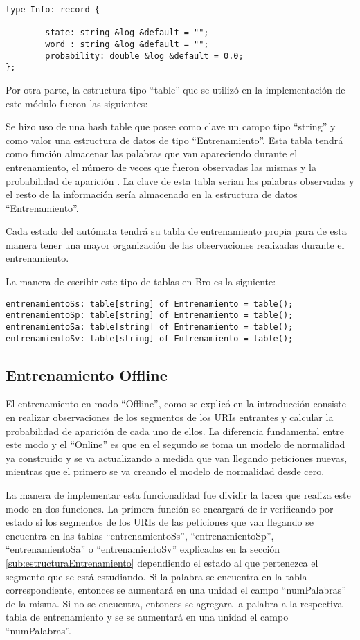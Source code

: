 \begin{verbatim}
type Info: record {

        state: string &log &default = "";
        word : string &log &default = "";
        probability: double &log &default = 0.0;
};
\end{verbatim}

Por otra parte, la estructura tipo “table” que se utilizó en la implementación de este módulo fueron las siguientes:

Se hizo uso de una hash table que posee como clave un campo tipo “string” y como valor una estructura de datos de tipo “Entrenamiento”. Esta tabla tendrá como función almacenar las palabras que van apareciendo durante el entrenamiento, el número de veces que fueron observadas las mismas y la probabilidad de aparición . La clave de esta tabla serian las palabras observadas y el resto de la información sería almacenado en la estructura de datos “Entrenamiento”.

Cada estado del autómata tendrá su tabla de entrenamiento propia para de esta manera tener una mayor organización de las observaciones realizadas durante el entrenamiento.

La manera de escribir este tipo de tablas en Bro es la siguiente:

\begin{verbatim}
entrenamientoSs: table[string] of Entrenamiento = table();
entrenamientoSp: table[string] of Entrenamiento = table();
entrenamientoSa: table[string] of Entrenamiento = table();
entrenamientoSv: table[string] of Entrenamiento = table();
\end{verbatim}

\subsection{Entrenamiento Offline}
El entrenamiento en modo “Offline”, como se explicó en la introducción consiste en realizar observaciones de los segmentos de los URIs entrantes y calcular la probabilidad de aparición de cada uno de ellos. La  diferencia fundamental entre este modo y el “Online” es que en el segundo se toma un modelo de normalidad ya construido y se va actualizando a medida que van llegando peticiones nuevas, mientras que el primero se va creando el modelo de normalidad desde cero.

La manera de implementar esta funcionalidad fue dividir la tarea que realiza este modo en dos funciones. La primera función se encargará de ir verificando por estado si los segmentos de los URIs de las peticiones que van llegando se encuentra en las tablas  “entrenamientoSs”, “entrenamientoSp”, “entrenamientoSa” o “entrenamientoSv”  explicadas en la sección \ref{sub:estructuraEntrenamiento} dependiendo el estado al que pertenezca el segmento que se está estudiando. Si  la palabra se encuentra en la tabla correspondiente, entonces se aumentará en una unidad el campo “numPalabras” de la misma. Si no se encuentra, entonces se agregara la palabra a la respectiva tabla de entrenamiento y se se aumentará en una unidad el campo “numPalabras”.

